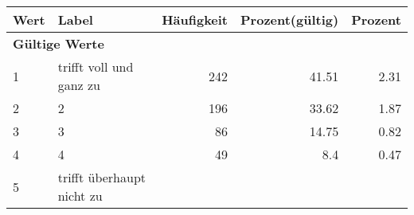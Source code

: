      \begin{longtable}{lXrrr}
     \toprule
     \textbf{Wert} & \textbf{Label} & \textbf{Häufigkeit} & \textbf{Prozent(gültig)} & \textbf{Prozent} \\
     \endhead
     \midrule
     \multicolumn{5}{l}{\textbf{Gültige Werte}}\\

     1 &
     \multicolumn{1}{X}{ trifft voll und ganz zu   } &


       \num{242} &
       \num[round-mode=places,round-precision=2]{41.51} &
         \num[round-mode=places,round-precision=2]{2.31} \\

     2 &
     \multicolumn{1}{X}{ 2   } &


       \num{196} &
       \num[round-mode=places,round-precision=2]{33.62} &
         \num[round-mode=places,round-precision=2]{1.87} \\

     3 &
     \multicolumn{1}{X}{ 3   } &


       \num{86} &
       \num[round-mode=places,round-precision=2]{14.75} &
         \num[round-mode=places,round-precision=2]{0.82} \\

     4 &
     \multicolumn{1}{X}{ 4   } &


       \num{49} &
       \num[round-mode=places,round-precision=2]{8.4} &
         \num[round-mode=places,round-precision=2]{0.47} \\

     5 &
     \multicolumn{1}{X}{ trifft überhaupt nicht zu   } &



\end{longtable}
